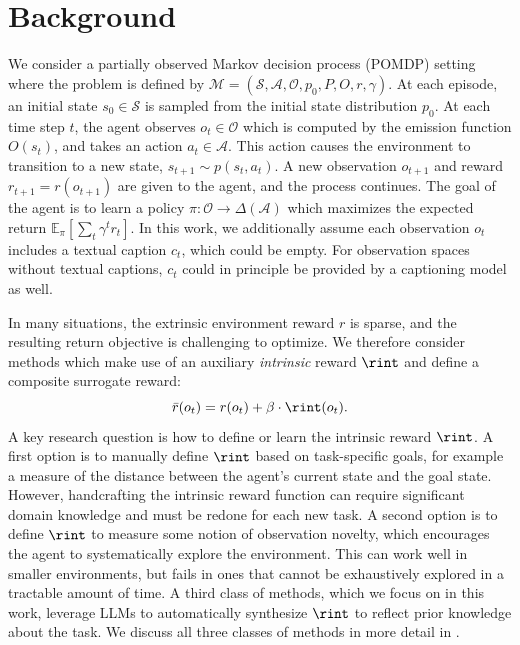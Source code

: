 \section{Background}

We consider a partially observed Markov decision process (POMDP) setting where the problem is defined by $\mathcal{M} = (\mathcal{S}, \mathcal{A}, \mathcal{O}, p_0, P, O, r, \gamma)$. 
%
At each episode, an initial state $s_0 \in \mathcal{S}$ is sampled from the initial state distribution $p_0$. 
At each time step $t$, the agent observes $o_t \in \mathcal{O}$
which is computed by the emission function $O(s_t)$,  and takes an action $a_t \in \mathcal{A}$. 
This action causes the environment to transition to a new state, $s_{t+1} \sim p(s_t, a_t)$. A new observation $o_{t+1}$ and reward $r_{t+1} = r(o_{t+1})$ are given to the agent, and the process continues. The goal of the agent is to learn a policy $\pi: \mathcal{O} \rightarrow \Delta(\mathcal{A})$ which maximizes the expected return $\mathbb{E}_{\pi}\left[\sum_t \gamma^t r_t\right]$. In this work, we additionally assume each observation $o_t$ includes a textual caption $c_t$, which could be empty. 
%
For observation spaces without textual captions, $c_t$ could in principle be provided by a captioning model as well. 

In many situations, the extrinsic environment reward $r$ is sparse, and the resulting return objective is challenging to optimize. We therefore consider methods which make use of an auxiliary \textit{intrinsic} reward $\rint$ and define a composite surrogate reward:
\begin{equation}
\bar{r}(o_t) =  r(o_t) + \beta \cdot \rint(o_t).
\label{eq:composed_reward}
\end{equation}
A key research question is how to define or learn the intrinsic reward $\rint$. 
A first option is to manually define $\rint$ based on task-specific goals, for example a measure of the distance between the agent's current state and the goal state. However, handcrafting the intrinsic reward function can require significant domain knowledge and must be redone for each new task.
A second option is to define $\rint$ to measure some notion of observation novelty, which encourages the agent to systematically explore the environment. This can work well in smaller environments, but fails in ones that cannot be exhaustively explored in a tractable amount of time. 
A third class of methods, which we focus on in this work, leverage LLMs to automatically synthesize $\rint$ to reflect prior knowledge about the task. We discuss all three classes of methods in more detail in . 


%

%
%
%
%
